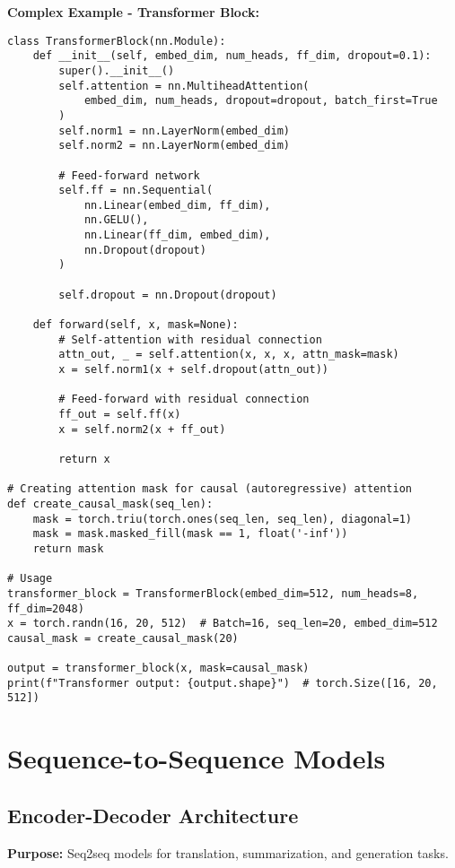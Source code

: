 \documentclass[11pt,a4paper]{book}
\begin{document}
\textbf{Complex Example - Transformer Block:}
\begin{verbatim}
class TransformerBlock(nn.Module):
    def __init__(self, embed_dim, num_heads, ff_dim, dropout=0.1):
        super().__init__()
        self.attention = nn.MultiheadAttention(
            embed_dim, num_heads, dropout=dropout, batch_first=True
        )
        self.norm1 = nn.LayerNorm(embed_dim)
        self.norm2 = nn.LayerNorm(embed_dim)
        
        # Feed-forward network
        self.ff = nn.Sequential(
            nn.Linear(embed_dim, ff_dim),
            nn.GELU(),
            nn.Linear(ff_dim, embed_dim),
            nn.Dropout(dropout)
        )
        
        self.dropout = nn.Dropout(dropout)
    
    def forward(self, x, mask=None):
        # Self-attention with residual connection
        attn_out, _ = self.attention(x, x, x, attn_mask=mask)
        x = self.norm1(x + self.dropout(attn_out))
        
        # Feed-forward with residual connection
        ff_out = self.ff(x)
        x = self.norm2(x + ff_out)
        
        return x

# Creating attention mask for causal (autoregressive) attention
def create_causal_mask(seq_len):
    mask = torch.triu(torch.ones(seq_len, seq_len), diagonal=1)
    mask = mask.masked_fill(mask == 1, float('-inf'))
    return mask

# Usage
transformer_block = TransformerBlock(embed_dim=512, num_heads=8, ff_dim=2048)
x = torch.randn(16, 20, 512)  # Batch=16, seq_len=20, embed_dim=512
causal_mask = create_causal_mask(20)

output = transformer_block(x, mask=causal_mask)
print(f"Transformer output: {output.shape}")  # torch.Size([16, 20, 512])
\end{verbatim}

\section{Sequence-to-Sequence Models}

\subsection{Encoder-Decoder Architecture}

\textbf{Purpose:} Seq2seq models for translation, summarization, and generation tasks.
\end{document}
